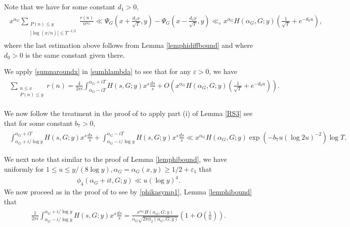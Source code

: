 \documentclass[twoside,leqno,10pt, A4]{amsart}
\begin{document}
  Note that we have for some constant $d_1>0$,
\begin{align}
\label{sumnaroundx}
\begin{split}
 x^{\alpha_G}\sum_{\substack{ P(n) \leq y \\ |\log (x/n)| \leq T^{-1/2}}}\frac {r(n)}{n^{\alpha_G}} \ll \Psi_G(x+\frac {d_1x}{\sqrt{T}},y)- \Psi_G(x-\frac {d_1x}{\sqrt{T}},y) \ll_{\varepsilon} x^{\alpha_G}H(\alpha_G, G;y)(\frac 1{\sqrt{T}}+e^{-d_0u}),
\end{split} 
\end{align} 
  where the last estimation above follows from Lemma \ref{lemphidiffbound} and where $d_0>0$ is the same constant given there. 

  We apply \eqref{sumnaroundx} in \eqref{sumhlambda} to see that for any $\varepsilon>0$, we have
\begin{align}
\label{sumhlambda1}
\begin{split}
\sum_{\substack{n \leq x \\ P(n) \leq y}} r(n) = \frac{4}{2 \pi i} \int_{\alpha_G - i T}^{\alpha_G + iT} H(s,G;y) x^s \frac{ds}{s} + O (x^{\alpha_G}H(\alpha_G, G;y)(\frac 1{\sqrt{T}}+e^{-d_0u})).
\end{split} 
\end{align}   
 
  We now follow the treatment in the proof of \cite[Lemma 10]{HT86} to apply part (i) of Lemma \ref{RS3} see that for some constant $b_7>0$, 
\begin{align}
\label{sumhlambda2}
\begin{split}
 \int_{\alpha_G + i /\log y}^{\alpha_G + iT} H(s,G;y) x^s \frac{ds}{s} + \int_{\alpha_G - i /\log y}^{\alpha_G - iT} H(s,G;y) x^s \frac{ds}{s} \ll x^{\alpha_G}H(\alpha_G,G;y)\exp(-b_7u(\log 2u)^{-2})\log T.
\end{split} 
\end{align}   

  We next note that similar to the proof of Lemma \ref{lemphibound}, we have uniformly for $1 \leq u \leq y/(8\log y), \alpha_G=\alpha_G(x,y) \geq 1/2+\varepsilon_1$ that
\begin{align}
\label{phikasymp1}
  \phi_4(\alpha_G+it,G;y) \ll u(\log y)^4. 
\end{align}
  We now proceed as in the proof of \cite[Lemma 11]{HT86} to see by \eqref{phikasymp1}, Lemma \ref{lemphibound} that
\begin{align}
\label{sumhlambda3}
\begin{split}
 \frac{1}{2 \pi i}\int_{\alpha_G - i /\log y}^{\alpha_G + i/\log y} H(s,G;y) x^s \frac{ds}{s} = \frac {x^{\alpha_G}H(\alpha_G,G;y)}{\alpha_G\sqrt{2\pi \phi_2(\alpha_G, G;y)}}(1+O(\frac 1u)).
\end{split} 
\end{align}   
\end{document}
